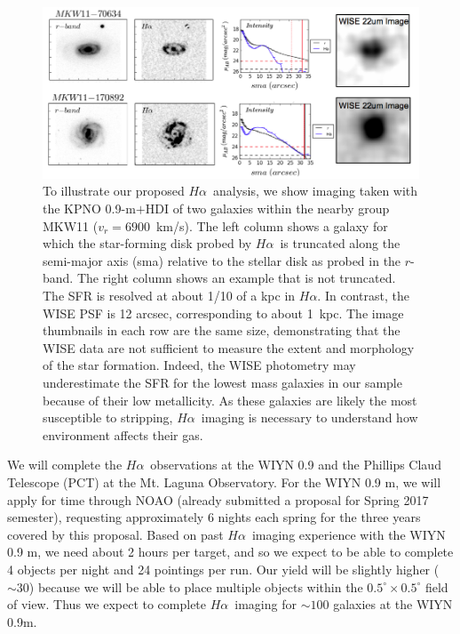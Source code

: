 \documentclass[11pt, preprint]{aastex}
\newcommand{\ha}{$H\alpha$}
\begin{document}
\begin{figure}[h]
\centering
\includegraphics[width=.85\textwidth]{HalphaProfileWISE.png}
\caption{\small
To illustrate our proposed \ha \  analysis, we show
imaging taken with the KPNO 0.9-m$+$HDI of two galaxies within the
nearby group  MKW11 ($v_r = 6900$~km/s). The left column shows a
galaxy for which the star-forming disk probed by \ha \ is truncated
along the semi-major axis (sma)  relative to the stellar disk as
probed in the $r$-band. The right column  shows an example that is not
truncated.  The SFR is resolved  at about 1/10 of a kpc in \ha. In
contrast, the WISE PSF is 12 arcsec, corresponding to about 1~kpc. The image thumbnails in each row are the same size, demonstrating
that the WISE data are not sufficient to measure the extent and
morphology of the star formation.   Indeed, the WISE photometry may
underestimate the SFR for  the lowest mass galaxies in our sample
because of their low metallicity.  As these galaxies are likely the
most susceptible to stripping, \ha\ imaging is necessary to understand
how environment affects their gas.}
\label{fig3}
\end{figure}


We will complete the \ha \ observations at the WIYN 0.9 and the Phillips Claud Telescope (PCT) at the Mt. Laguna Observatory.  For the WIYN 0.9 m, we will apply for time through NOAO (already submitted a proposal for Spring 2017 semester), requesting
approximately 6 nights each spring for the three years covered by this
proposal.  Based on past \ha \ imaging experience with the WIYN 0.9 m,
we need about 2 hours per target, and so we expect to be able to
complete 4 objects per night and 24 pointings per run.  Our yield will 
be slightly higher ($\sim 30$) because we will be able to place multiple objects within
the $0.5^\circ \times 0.5^\circ$ field of view.  Thus we expect to
complete \ha \ imaging for
$\sim 100$ galaxies at the WIYN 0.9m. 
\end{document}
